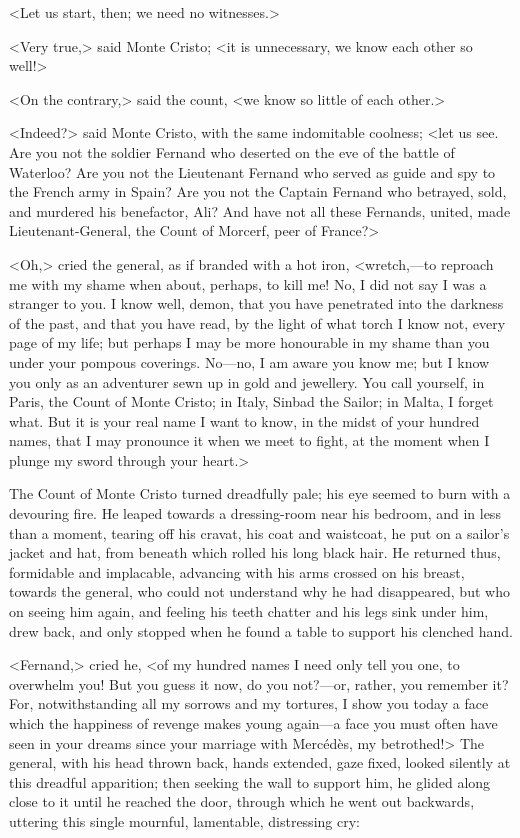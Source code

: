  <Let us start, then; we need no witnesses.> 

 <Very true,> said Monte Cristo; <it is unnecessary, we know each other so well!> 

 <On the contrary,> said the count, <we know so little of each other.> 

 <Indeed?> said Monte Cristo, with the same indomitable coolness; <let us see. Are you not the soldier Fernand who deserted on the eve of the battle of Waterloo? Are you not the Lieutenant Fernand who served as guide and spy to the French army in Spain? Are you not the Captain Fernand who betrayed, sold, and murdered his benefactor, Ali? And have not all these Fernands, united, made Lieutenant-General, the Count of Morcerf, peer of France?> 

 <Oh,> cried the general, as if branded with a hot iron, <wretch,—to reproach me with my shame when about, perhaps, to kill me! No, I did not say I was a stranger to you. I know well, demon, that you have penetrated into the darkness of the past, and that you have read, by the light of what torch I know not, every page of my life; but perhaps I may be more honourable in my shame than you under your pompous coverings. No—no, I am aware you know me; but I know you only as an adventurer sewn up in gold and jewellery. You call yourself, in Paris, the Count of Monte Cristo; in Italy, Sinbad the Sailor; in Malta, I forget what. But it is your real name I want to know, in the midst of your hundred names, that I may pronounce it when we meet to fight, at the moment when I plunge my sword through your heart.> 

 The Count of Monte Cristo turned dreadfully pale; his eye seemed to burn with a devouring fire. He leaped towards a dressing-room near his bedroom, and in less than a moment, tearing off his cravat, his coat and waistcoat, he put on a sailor's jacket and hat, from beneath which rolled his long black hair. He returned thus, formidable and implacable, advancing with his arms crossed on his breast, towards the general, who could not understand why he had disappeared, but who on seeing him again, and feeling his teeth chatter and his legs sink under him, drew back, and only stopped when he found a table to support his clenched hand. 

 <Fernand,> cried he, <of my hundred names I need only tell you one, to overwhelm you! But you guess it now, do you not?—or, rather, you remember it? For, notwithstanding all my sorrows and my tortures, I show you today a face which the happiness of revenge makes young again—a face you must often have seen in your dreams since your marriage with Mercédès, my betrothed!>  The general, with his head thrown back, hands extended, gaze fixed, looked silently at this dreadful apparition; then seeking the wall to support him, he glided along close to it until he reached the door, through which he went out backwards, uttering this single mournful, lamentable, distressing cry: 

